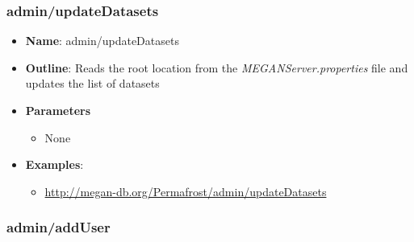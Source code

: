 \documentclass[11pt]{article}
\begin{document}
\subsubsection{admin/updateDatasets}
\label{subsubsec:upProp}
\begin{itemize}
	\item \textbf{Name}: admin/updateDatasets
	\item \textbf{Outline}: Reads the root location from the \textit{MEGANServer.properties} file and updates the list of datasets
	\item \textbf{Parameters}
		\begin{itemize}
			\item  None
		\end{itemize}
	\item \textbf{Examples}:
		\begin{itemize}		
			\item \url{http://megan-db.org/Permafrost/admin/updateDatasets}
		\end{itemize}
\end{itemize}



\subsubsection{admin/addUser}
\end{document}
